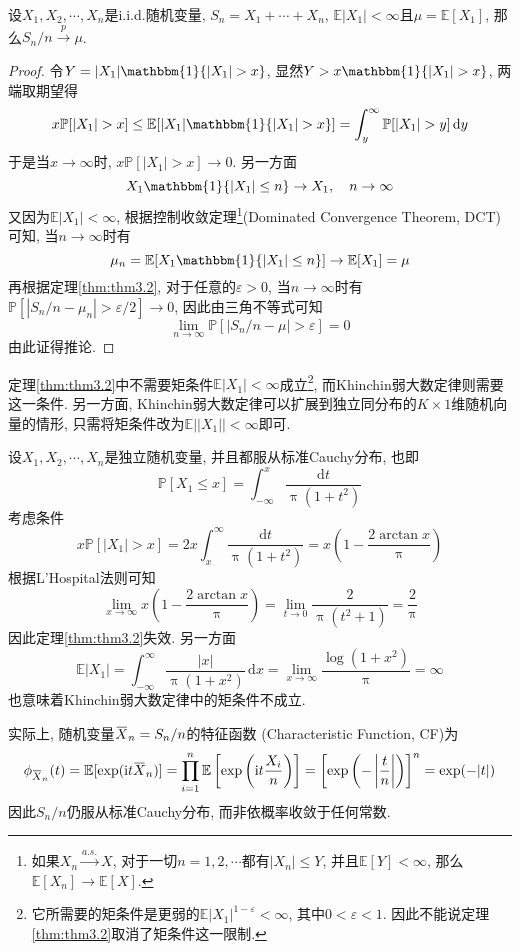 \documentclass[cn, 12pt, math=mtpro2, bibstyle=apa, blue, twocol]{elegantbook}
\newcommand{\E}{\mathbb{E}}
\newcommand{\PP}{\mathbb{P}}
\newcommand{\limn}{\lim_{n\to\infty}}
\newcommand{\overbar}[1]{\mkern 1.5mu\overline{\mkern-1.5mu#1\mkern-1.5mu}\mkern 1.5mu}
\begin{document}
\begin{corollary}[Khinchin弱大数定律]
设$X_1, X_2,\cdots, X_n$是i.i.d.随机变量, $S_n=X_1+\cdots+X_n$, $\E|X_1|<\infty$且$\mu=\E[X_1]$, 那么$S_n/n\xrightarrow{p}\mu$.
\end{corollary}
\begin{proof}
  令$Y=|X_1|\mathbbm{1}\{|X_1|>x\}$, 显然$Y>x\mathbbm{1}\{|X_1|>x\}$, 两端取期望得
  $$x\PP[|X_1|>x]\leq \E[|X_1|\mathbbm{1}\{|X_1|>x\}]=\int_{y}^{\infty}\PP[|X_1|>y]\,\text{d}y$$
  于是当$x\to\infty$时, $x\PP[|X_1|>x]\to0$. 另一方面
  $$X_1\mathbbm{1}\{|X_1|\leq n\}\to X_1,\quad n\to\infty$$
  又因为$\E|X_1|<\infty$, 根据控制收敛定理\footnote{如果$X_n\xrightarrow{a.s.}X$, 对于一切$n=1,2,\cdots$都有$|X_n|\leq Y$, 并且$\E[Y]<\infty$, 那么$\E[X_n]\to\E[X]$.}(Dominated Convergence Theorem, DCT)可知, 当$n\to\infty$时有
  $$\mu_n=\E[X_1\mathbbm{1}\{|X_1|\leq n\}]\to \E[X_1]=\mu$$
  再根据定理\ref{thm:thm3.2}, 对于任意的$\varepsilon>0$, 当$n\to\infty$时有$\PP[|S_n/n-\mu_n|>\varepsilon/2]\to0$, 因此由三角不等式可知
  $$\limn \PP[|S_n/n-\mu|>\varepsilon]=0$$
  由此证得推论.
\end{proof}
\begin{remark}
定理\ref{thm:thm3.2}中不需要矩条件$\E|X_1|<\infty$成立\footnote{它所需要的矩条件是更弱的$\E|X_1|^{1-\varepsilon}<\infty$, 其中$0<\varepsilon<1$. 因此不能说定理\ref{thm:thm3.2}取消了矩条件这一限制.}, 而Khinchin弱大数定律则需要这一条件. 另一方面, Khinchin弱大数定律可以扩展到独立同分布的$K\times1$维随机向量的情形, 只需将矩条件改为$\E||X_1||<\infty$即可.
\end{remark}
\begin{example}[弱大数定律不成立的情况]\label{eg4}
设$X_1,X_2,\cdots,X_n$是独立随机变量, 并且都服从标准Cauchy分布, 也即
$$\PP[X_1\leq x]=\int_{-\infty}^{x}\frac{\text{d}t}{\uppi(1+t^2)}$$
考虑条件
$$x\PP[|X_1|>x]=2x\int_{x}^{\infty}\frac{\text{d}t}{\uppi(1+t^2)}=x\left(1-\frac{2\arctan x}{\uppi}\right)$$
根据L'Hospital法则可知
$$\lim_{x\to\infty}x\left(1-\frac{2\arctan x}{\uppi}\right)=\lim_{t\to0}\frac{2}{\uppi(t^2+1)}=\frac{2}{\uppi}$$
因此定理\ref{thm:thm3.2}失效. 另一方面
$$\E|X_1|=\int_{-\infty}^{\infty}\frac{|x|}{\uppi(1+x^2)}\,\text{d}x=\lim_{x\to\infty}\frac{\log(1+x^2)}{\uppi}=\infty$$
也意味着Khinchin弱大数定律中的矩条件不成立.

实际上, 随机变量$\overbar{X}_n=S_n/n$的特征函数 (Characteristic Function, CF)为
\begin{align*}
\phi_{\overbar{X}_n}(t)=\E[\exp({\text{i}t\overbar{X}_n})]=\prod_{i=1}^{n}\E\left[\exp\left({\text{i}t\frac{X_i}{n}}\right)\right]=\left[\exp\left(-\left|\frac{t}{n}\right|\right)\right]^n=\exp(-|t|)
\end{align*}
因此$S_n/n$仍服从标准Cauchy分布, 而非依概率收敛于任何常数.
\end{example}
\end{document}
